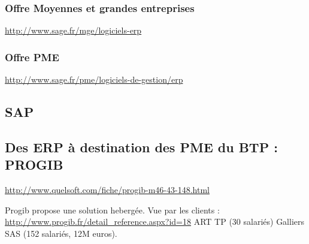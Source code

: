 \subsubsection{Offre Moyennes et grandes entreprises}
\url{http://www.sage.fr/mge/logiciels-erp}
\subsubsection{Offre PME}
\url{http://www.sage.fr/pme/logiciels-de-gestion/erp}

\subsection{SAP}

\subsection{Des ERP à destination des PME du BTP : PROGIB}
\url{http://www.quelsoft.com/fiche/progib-m46-43-148.html}
 
Progib propose une solution hebergée.
Vue par les clients :
\url{http://www.progib.fr/detail_reference.aspx?id=18} ART TP (30 salariés)
Galliers SAS (152 salariés, 12M euros).